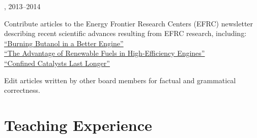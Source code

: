 \vspace{\baselineskip}

,  \hfill 2013--2014\\

\begin{innerlist}
\item Contribute articles to the Energy Frontier Research Centers (EFRC)
newsletter describing recent scientific advances resulting from
EFRC research, including:\\
\hspace*{0.25in}\href{http://www.energyfrontier.us/newsletter/201210/burning-butanol-better-engine}
{``Burning Butanol in a Better Engine''}\\
\hspace*{0.25in}\href{http://www.energyfrontier.us/newsletter/201401/advantage-renewable-fuels-high-efficiency-engines}
{``The Advantage of Renewable Fuels in High-Efficiency Engines''}\\
\hspace*{0.25in}\href{http://www.energyfrontier.us/newsletter/201404/confined-catalysts-last-longer}
{``Confined Catalysts Last Longer''}
\item Edit articles written by other board members for factual and grammatical correctness.
\end{innerlist}


\section{{\sectionfont{} Teaching Experience}}

